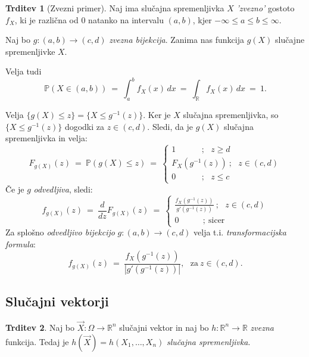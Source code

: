 \documentclass[11pt]{article}
\newcommand{\p}{\mathbb{P}}
\newcommand{\R}{\mathbb{R}}
\newcommand{\1}{\mathbbm{1}}
\theoremstyle{definition}
\theoremstyle{definition}
\newtheorem{trditev}{Trditev}[section]
\theoremstyle{definition}
\begin{document}
\begin{trditev}[Zvezni primer]

Naj ima slučajna spremenljivka $X$ \textit{'zvezno'} gostoto $f_X$, ki je različna od $0$ natanko na intervalu $(a, b)$, kjer $-\infty \leq a \leq b \leq \infty$. 

Naj bo $g: (a, b) \rightarrow (c, d)$ \textit{zvezna bijekcija}. Zanima nas funkcija $g(X)$ slučajne spremenljivke $X$.

Velja tudi
$$\p(X \in (a, b)) ~=~ \int_a^b f_X (x)\,dx ~=~ \int_{\R} f_X (x)\,dx ~=~ 1.$$

Velja $\{ g(X) \leq z \} = \{ X \leq g^{-1}(z) \}$. Ker je $X$ slučajna spremenljivka, so  $\{ X \leq g^{-1}(z) \}$ dogodki za $z \in (c, d).$ Sledi, da je $g(X)$ slučajna spremenljivka in velja:
$$F_{g(X)}(z) ~=~ \p(g(X) \leq z) ~=~ \begin{cases}
1~~~~~~~~~~~~~~; ~~~z \geq d \\
F_X(g^{-1}(z))~; ~~~z \in (c, d) \\
0~~~~~~~~~~~~~~; ~~~z \leq c
\end{cases}$$
Če je $g$ \textit{odvedljiva}, sledi:
$$f_{g(X)}(z) ~=~ \frac{d}{dz} F_{g(X)}(z)  ~=~ \begin{cases}
\frac{f_X(g^{-1}(z))}{g'(g^{-1}(z))}~; ~~~z \in (c, d) \\
0~~~~~~~~~~~~~; ~\text{sicer}
\end{cases}$$
Za splošno \textit{odvedljivo bijekcijo} $g: (a, b) \rightarrow (c, d)$ velja t.i. \textit{transformacijska formula}:
$$f_{g(X)}(z) ~=~ \frac{f_X(g^{-1}(z))}{|g'(g^{-1}(z))|}, ~~~\text{za}~ z \in (c, d).$$
 
\end{trditev}
\vspace{0.5cm}


\subsection{Slučajni vektorji}
\vspace{0.5cm}

\begin{trditev}

Naj bo $\vec{X}: \Omega \rightarrow \R^n$ slučajni vektor in naj bo $h: \R^n \rightarrow \R$ \textit{zvezna} funkcija. Tedaj je $h(\vec{X}) = h(X_1, \ldots, X_n)$ \textit{slučajna spremenljivka}.

\end{trditev}
\vspace{0.5cm}
\end{document}
